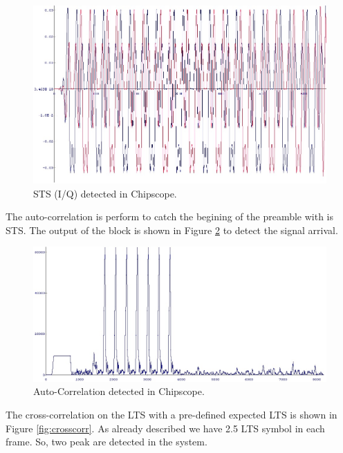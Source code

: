 \begin{figure}
\centering
\includegraphics[width=12cm]{content/fig/sts_chipscope.JPG}
\caption{STS (I/Q) detected in Chipscope.}
\label{fig:sts_chipscope}
\end{figure}

The auto-correlation is perform to catch the begining of the preamble with is STS. The output of the block is shown in Figure \ref{fig:autocorr} to detect the signal arrival.\\

\begin{figure}
\centering
\includegraphics[width=\textwidth]{content/fig/autocorr.JPG}
\caption{Auto-Correlation detected in Chipscope.}
\label{fig:autocorr}
\end{figure}

The cross-correlation on the LTS with a pre-defined expected LTS is shown in Figure \ref{fig:crosscorr}. As already described we have 2.5 LTS symbol in each frame. So, two peak are detected in the system.\\

